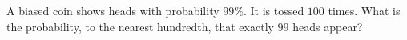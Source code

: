 A biased coin shows heads with probability $99\%$. It is tossed $100$ times. What is the probability, to the nearest hundredth, that exactly $99$ heads appear?
